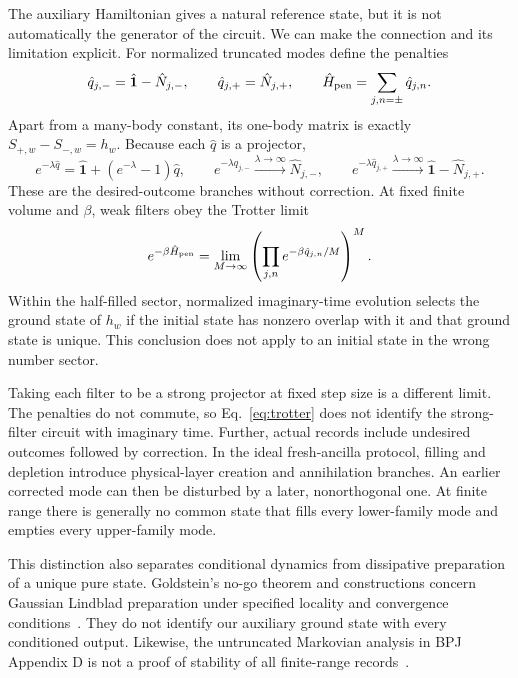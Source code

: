 \documentclass[aps,prb,onecolumn,nofootinbib,superscriptaddress]{revtex4-2}
\begin{document}
The auxiliary Hamiltonian gives a natural reference state, but it is not
automatically the generator of the circuit. We can make the connection and
its limitation explicit. For normalized truncated modes define the penalties
\begin{equation}
 \hat q_{j,-}=\hat{\mathbf{1}}-\hat N_{j,-},\qquad
 \hat q_{j,+}=\hat N_{j,+},\qquad
 \hat H_{\rm pen}=\sum_{j,n=\pm}\hat q_{j,n}.
 \label{eq:penalties}
\end{equation}
Apart from a many-body constant, its one-body matrix is exactly
$S_{+,w}-S_{-,w}=h_w$. Because each $\hat q$ is a projector,
\begin{equation}
 e^{-\lambda\hat q}=\hat{\mathbf{1}}+(e^{-\lambda}-1)\hat q,
 \qquad e^{-\lambda\hat q_{j,-}}\xrightarrow{\lambda\to\infty}\hat N_{j,-},
 \qquad e^{-\lambda\hat q_{j,+}}\xrightarrow{\lambda\to\infty}
 \hat{\mathbf{1}}-\hat N_{j,+}.
 \label{eq:filter}
\end{equation}
These are the desired-outcome branches without correction. At fixed finite
volume and $\beta$, weak filters obey the Trotter limit
\begin{equation}
 e^{-\beta\hat H_{\rm pen}}
 =\lim_{M\to\infty}\left(\prod_{j,n}e^{-\beta\hat q_{j,n}/M}\right)^M.
 \label{eq:trotter}
\end{equation}
Within the half-filled sector, normalized imaginary-time evolution selects
the ground state of $h_w$ if the initial state has nonzero overlap with it
and that ground state is unique. This conclusion does not apply to an
initial state in the wrong number sector.

Taking each filter to be a strong projector at fixed step size is a
different limit. The penalties do not commute, so Eq.~\eqref{eq:trotter}
does not identify the strong-filter circuit with imaginary time. Further,
actual records include undesired outcomes followed by correction. In the
ideal fresh-ancilla protocol, filling and depletion introduce physical-layer
creation and annihilation branches. An earlier corrected mode can then be
disturbed by a later, nonorthogonal one. At finite range there is generally
no common state that fills every lower-family mode and empties every
upper-family mode.

This distinction also separates conditional dynamics from dissipative
preparation of a unique pure state. Goldstein's no-go theorem and constructions
concern Gaussian Lindblad preparation under specified locality and convergence
conditions~\cite{Goldstein2019}. They do not identify our auxiliary ground
state with every conditioned output. Likewise, the untruncated Markovian
analysis in BPJ Appendix D is not a proof of stability of all finite-range
records~\cite{BPJ}.
\end{document}
